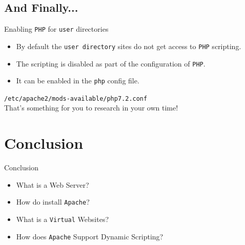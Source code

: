 \documentclass[xcolor=table,aspectratio=169]{beamer}
\begin{document}
\subsection{And Finally...}
\begin{frame}{Enabling \texttt{PHP} for \texttt{user} directories}
  \begin{itemize}
    \item By default the \texttt{user directory} sites do not get access to \texttt{PHP} scripting.
    \item The scripting is disabled as part of the configuration of \texttt{PHP}.
    \item It can be enabled in the \texttt{php} config file.
  \end{itemize}
  \begin{tcolorbox}
    \begin{center}
      \scriptsize \texttt{/etc/apache2/mods-available/php7.2.conf}\\
      That's something for you to research in your own time!
    \end{center}
  \end{tcolorbox}
\end{frame}

\section*{Conclusion}
\begin{frame}{Conclusion}
  \begin{itemize}
    \item What is a Web Server?
    \item How do install \texttt{Apache}?
    \item What is a \texttt{Virtual} Websites?
    \item How does \texttt{Apache} Support Dynamic Scripting?
  \end{itemize}
\end{frame}
\end{document}
